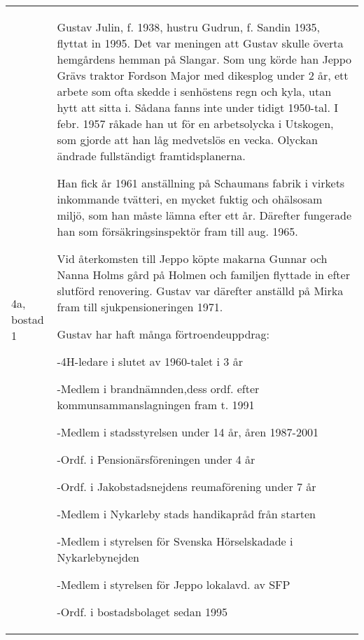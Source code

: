 \begin{center}
  \begin{longtable}{l p{}}
    \hline
    4a, bostad 1 & Gustav Julin, f. 1938, hustru Gudrun, f. Sandin 1935, flyttat in 1995. Det var meningen att Gustav skulle överta  hemgårdens hemman på Slangar. Som ung körde han Jeppo Grävs traktor Fordson Major med dikesplog under 2 år, ett arbete som ofta skedde i senhöstens regn och kyla, utan hytt att sitta i. Sådana fanns inte under tidigt 1950-tal. I febr. 1957 råkade han ut för en arbetsolycka i Utskogen, som gjorde att han låg medvetslös en vecka.  Olyckan ändrade fullständigt framtidsplanerna.

    Han fick år 1961 anställning på Schaumans fabrik i virkets inkommande tvätteri, en mycket fuktig och ohälsosam miljö, som han måste lämna efter ett år. Därefter fungerade han som försäkringsinspektör fram till aug. 1965.

    Vid återkomsten till Jeppo köpte makarna Gunnar och Nanna Holms gård på Holmen och familjen flyttade in efter slutförd renovering. Gustav var därefter anställd på Mirka fram till sjukpensioneringen 1971.

    Gustav har haft många förtroendeuppdrag:

    -4H-ledare i slutet av 1960-talet i 3 år

    -Medlem i brandnämnden,dess ordf. efter kommunsammanslagningen fram t. 1991

    -Medlem i stadsstyrelsen under 14 år, åren 1987-2001

    -Ordf. i Pensionärsföreningen under 4 år

    -Ordf. i Jakobstadsnejdens reumaförening under 7 år

    -Medlem i Nykarleby stads handikapråd från starten

    -Medlem i styrelsen för Svenska Hörselskadade i Nykarlebynejden

    -Medlem i styrelsen för Jeppo lokalavd. av SFP

    -Ordf. i bostadsbolaget sedan 1995


\end{longtable}
\end{center}
